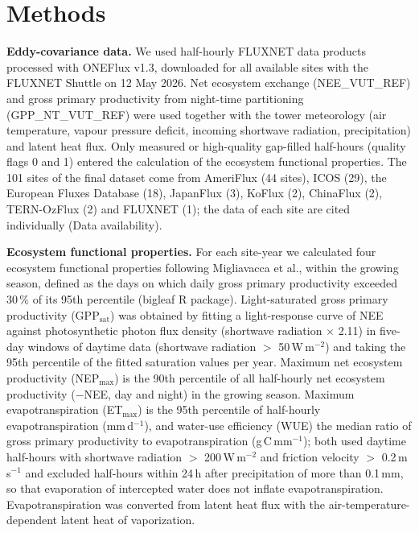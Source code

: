 \documentclass[11pt,a4paper]{article}
\begin{document}
\section*{Methods}


\textbf{Eddy-covariance data.} We used half-hourly FLUXNET data products processed with ONEFlux v1.3\cite{pastorello2020fluxnet2015},
downloaded for all available sites with the FLUXNET Shuttle on 12 May 2026. Net ecosystem exchange (NEE\_VUT\_REF) and gross
primary productivity from night-time partitioning (GPP\_NT\_VUT\_REF\cite{reichstein2005separation}) were used together with the
tower meteorology (air temperature, vapour pressure deficit, incoming shortwave radiation, precipitation) and latent heat flux.
Only measured or high-quality gap-filled half-hours (quality flags 0 and 1) entered the calculation of the ecosystem functional
properties. The 101 sites of the final dataset come from AmeriFlux (44 sites), ICOS (29), the European Fluxes Database (18),
JapanFlux\cite{ueyama2025japanflux} (3), KoFlux (2), ChinaFlux\cite{yu2006chinaflux} (2), TERN-OzFlux\cite{beringer2016ozflux,isaac2017ozflux}
(2) and FLUXNET (1); the data of each site are cited individually (Data availability).

\textbf{Ecosystem functional properties.} For each site-year we calculated four ecosystem functional properties following
Migliavacca et al.\cite{migliavacca2021three}, within the growing season, defined as the days on which daily gross primary
productivity exceeded 30\,\% of its 95th percentile (bigleaf R package\cite{knauer2018bigleaf}). Light-saturated gross
primary productivity (GPP$_\mathrm{sat}$) was obtained by fitting a light-response curve of NEE against photosynthetic photon
flux density (shortwave radiation $\times$ 2.11) in five-day windows of daytime data (shortwave radiation $>$ 50\,W\,m$^{-2}$)
and taking the 95th percentile of the fitted saturation values per year\cite{lasslop2010separation,migliavacca2021three}. Maximum
net ecosystem productivity (NEP$_\mathrm{max}$) is the 90th percentile of all half-hourly net ecosystem productivity
($-$NEE, day and night) in the growing season\cite{migliavacca2021three}. Maximum evapotranspiration (ET$_\mathrm{max}$) is the
95th percentile of half-hourly evapotranspiration (mm\,d$^{-1}$), and water-use efficiency (WUE) the median ratio of gross
primary productivity to evapotranspiration (g\,C\,mm$^{-1}$)\cite{knauer2018bigleaf}; both used daytime half-hours with shortwave radiation $>$ 200\,W\,m$^{-2}$ and
friction velocity $>$ 0.2\,m\,s$^{-1}$ and excluded half-hours within 24\,h after precipitation of more than
0.1\,mm, so that evaporation of intercepted water does not inflate evapotranspiration. Evapotranspiration was converted from latent
heat flux with the air-temperature-dependent latent heat of vaporization\cite{knauer2018bigleaf}.
\end{document}
